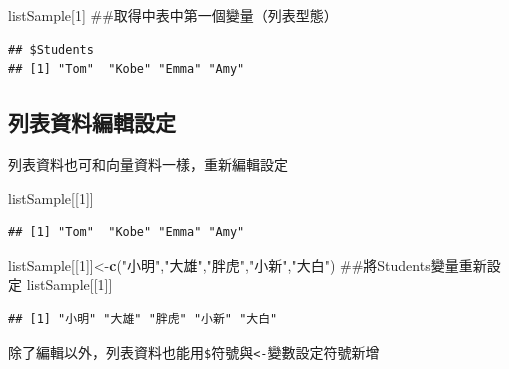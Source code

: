 \documentclass[]{book}
\newenvironment{Shaded}{\begin{snugshade}}{\end{snugshade}}
\newcommand{\KeywordTok}[1]{\textcolor[rgb]{0.13,0.29,0.53}{\textbf{{#1}}}}
\newcommand{\DecValTok}[1]{\textcolor[rgb]{0.00,0.00,0.81}{{#1}}}
\newcommand{\StringTok}[1]{\textcolor[rgb]{0.31,0.60,0.02}{{#1}}}
\newcommand{\NormalTok}[1]{{#1}}
\theoremstyle{definition}
\theoremstyle{definition}
\theoremstyle{remark}
\begin{document}
\begin{Shaded}
\begin{Highlighting}[]
\NormalTok{listSample[}\DecValTok{1}\NormalTok{] ##取得中表中第一個變量（列表型態）}
\end{Highlighting}
\end{Shaded}

\begin{verbatim}
## $Students
## [1] "Tom"  "Kobe" "Emma" "Amy"
\end{verbatim}

\subsection{列表資料編輯設定}

列表資料也可和向量資料一樣，重新編輯設定

\begin{Shaded}
\begin{Highlighting}[]
\NormalTok{listSample[[}\DecValTok{1}\NormalTok{]] }
\end{Highlighting}
\end{Shaded}

\begin{verbatim}
## [1] "Tom"  "Kobe" "Emma" "Amy"
\end{verbatim}

\begin{Shaded}
\begin{Highlighting}[]
\NormalTok{listSample[[}\DecValTok{1}\NormalTok{]]<-}\KeywordTok{c}\NormalTok{(}\StringTok{"小明"}\NormalTok{,}\StringTok{"大雄"}\NormalTok{,}\StringTok{"胖虎"}\NormalTok{,}\StringTok{"小新"}\NormalTok{,}\StringTok{"大白"}\NormalTok{) ##將Students變量重新設定}
\NormalTok{listSample[[}\DecValTok{1}\NormalTok{]] }
\end{Highlighting}
\end{Shaded}

\begin{verbatim}
## [1] "小明" "大雄" "胖虎" "小新" "大白"
\end{verbatim}

除了編輯以外，列表資料也能用\texttt{\$}符號與\texttt{\textless{}-}變數設定符號新增

\begin{Shaded}
\end{Shaded}
\end{document}
